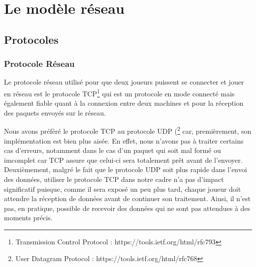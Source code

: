 \section{Le modèle réseau}

\subsection{Protocoles}
	\subsubsection{Protocole Réseau}
	Le protocole réseau utilisé pour que deux joueurs puissent se connecter et jouer en réseau est le protocole TCP\footnote{Transmission Control Protocol : https://tools.ietf.org/html/rfc793} qui est un protocole en mode connecté mais également fiable quant à la connexion entre deux machines et pour la réception des paquets envoyés sur le réseau. \newline
	
	Nous avons préféré le protocole TCP au protocole UDP (\footnote{User Datagram Protocol : https://tools.ietf.org/html/rfc768} car, premièrement, son implémentation est bien plus aisée. En effet, nous n'avons pas à traiter certains cas d'erreurs, notamment dans le cas d'un paquet qui soit mal formé ou imcomplet car TCP assure que celui-ci sera totalement prêt avant de l'envoyer. \newline
	Deuxièmement, malgré le fait que le protocole UDP soit plus rapide dans l'envoi des données, utiliser le protocole TCP dans notre cadre n'a pas d'impact significatif puisque, comme il sera exposé un peu plus tard, chaque joueur doit attendre la réception de données avant de continuer son traitement. Ainsi, il n'est pas, en pratique, possible de recevoir des données qui ne sont pas attendues à des moments précis.

